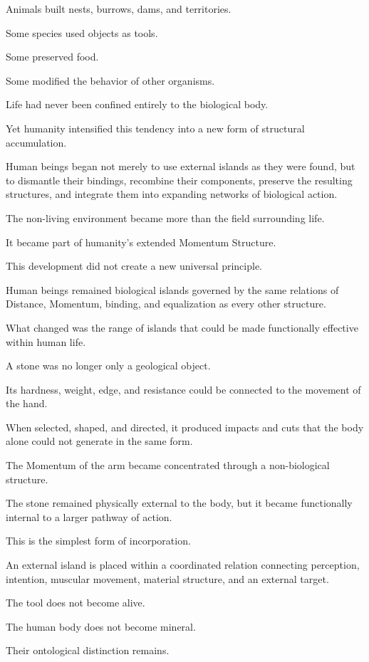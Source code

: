Animals built nests, burrows, dams, and territories.

Some species used objects as tools.

Some preserved food.

Some modified the behavior of other organisms.

Life had never been confined entirely to the biological body.

Yet humanity intensified this tendency into a new form of structural accumulation.

Human beings began not merely to use external islands as they were found, but to dismantle their bindings, recombine their components, preserve the resulting structures, and integrate them into expanding networks of biological action.

The non-living environment became more than the field surrounding life.

It became part of humanity’s extended Momentum Structure.

This development did not create a new universal principle.

Human beings remained biological islands governed by the same relations of Distance, Momentum, binding, and equalization as every other structure.

What changed was the range of islands that could be made functionally effective within human life.

A stone was no longer only a geological object.

Its hardness, weight, edge, and resistance could be connected to the movement of the hand.

When selected, shaped, and directed, it produced impacts and cuts that the body alone could not generate in the same form.

The Momentum of the arm became concentrated through a non-biological structure.

The stone remained physically external to the body, but it became functionally internal to a larger pathway of action.

This is the simplest form of incorporation.

An external island is placed within a coordinated relation connecting perception, intention, muscular movement, material structure, and an external target.

The tool does not become alive.

The human body does not become mineral.

Their ontological distinction remains.

